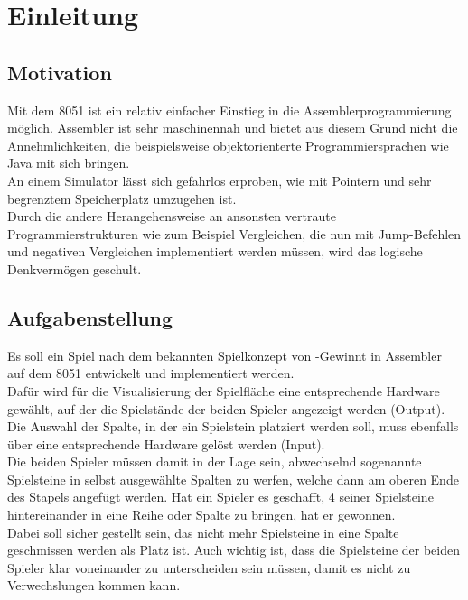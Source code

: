 



\newcommand{\autor}{Max Heidinger, Sophia Matthis, Pascal Riesinger, Martin Stephan}
\newcommand{\kurs}{TINF17B1}
\newcommand{\titel}{4-Gewinnt auf einem Mikrocomputer der 8051-Famile}



\tableofcontents

\chapter{Einleitung}

\section{Motivation}

Mit dem 8051 ist ein relativ einfacher Einstieg in die Assemblerprogrammierung möglich. Assembler ist sehr maschinennah und bietet aus diesem Grund
nicht die Annehmlichkeiten, die beispielsweise objektorienterte Programmiersprachen wie Java mit sich bringen.\\
An einem Simulator lässt sich gefahrlos erproben, wie mit Pointern und sehr begrenztem Speicherplatz umzugehen ist.\\
Durch die andere Herangehensweise an ansonsten vertraute Programmierstrukturen wie zum Beispiel Vergleichen, die nun mit Jump-Befehlen und negativen
Vergleichen implementiert werden müssen, wird das logische Denkvermögen geschult.

\section{Aufgabenstellung}

Es soll ein Spiel nach dem bekannten Spielkonzept von -Gewinnt\grqq{} in Assembler auf dem 8051 entwickelt und
implementiert werden.\\
Dafür wird für die Visualisierung der Spielfläche eine entsprechende Hardware gewählt,
auf der die Spielstände der beiden Spieler angezeigt werden (Output). Die Auswahl der Spalte, in der ein
\glqq Spielstein\grqq{} platziert werden soll, muss ebenfalls über eine entsprechende Hardware gelöst werden (Input).\\
Die beiden Spieler müssen damit in der Lage sein, abwechselnd sogenannte Spielsteine in selbst ausgewählte Spalten zu werfen,
welche dann am oberen Ende des Stapels angefügt werden. Hat ein Spieler es geschafft, 4 seiner Spielsteine hintereinander
in eine Reihe oder Spalte zu bringen, hat er gewonnen.\\
Dabei soll sicher gestellt sein, das nicht mehr Spielsteine in eine Spalte geschmissen werden als Platz ist. Auch wichtig ist, dass die Spielsteine
der beiden Spieler klar voneinander zu unterscheiden sein müssen, damit es nicht zu Verwechslungen kommen kann.


